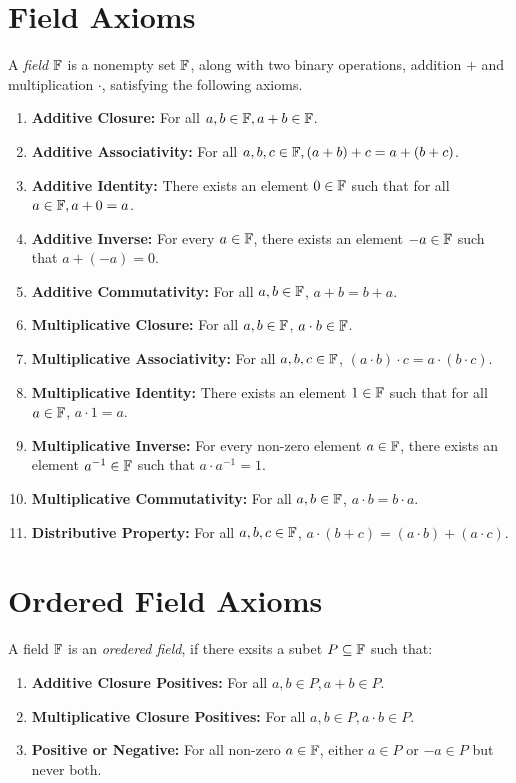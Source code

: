 \section{Field Axioms}

\begin{definition}
  A \emph{field} $\mathbb{F}$ is a nonempty set $\mathbb{F}$, along with two binary operations, addition $+$ and multiplication $\cdot$, satisfying the following axioms.
  \begin{enumerate}
    \item \textbf{Additive Closure:} For all $a, b \in \mathbb{F}, a + b \in \mathbb{F}$.
    \item \textbf{Additive Associativity:} For all $a, b, c \in \mathbb{F}, (a + b) + c = a + (b + c)$.
    \item \textbf{Additive Identity:} There exists an element $0 \in \mathbb{F}$ such that for all $a \in \mathbb{F}, a + 0 = a$.
    \item \textbf{Additive Inverse:} For every $a \in \mathbb{F}$, there exists an element $-a \in \mathbb{F}$ such that $a + (-a) = 0$.
    \item \textbf{Additive Commutativity:} For all $a, b \in \mathbb{F}$, $a + b = b + a$.
    \item \textbf{Multiplicative Closure:} For all $a, b \in \mathbb{F}$, $a \cdot b \in \mathbb{F}$.
    \item \textbf{Multiplicative Associativity:} For all $a, b, c \in \mathbb{F}$, $(a \cdot b) \cdot c = a \cdot (b \cdot c)$.
    \item \textbf{Multiplicative Identity:} There exists an element $1 \in \mathbb{F}$ such that for all $a \in \mathbb{F}$, $a \cdot 1 = a$.
    \item \textbf{Multiplicative Inverse:} For every non-zero element $a \in \mathbb{F}$, there exists an element $a^{-1} \in \mathbb{F}$ such that $a \cdot a^{-1} = 1$.
    \item \textbf{Multiplicative Commutativity:} For all $a, b \in \mathbb{F}$, $a \cdot b = b \cdot a$.
    \item \textbf{Distributive Property:} For all $a, b, c \in \mathbb{F}$, $a \cdot (b + c) = (a \cdot b) + (a \cdot c)$.
  \end{enumerate}
\end{definition}

\section{Ordered Field Axioms}

\begin{definition}
  A field $\mathbb{F}$ is an \emph{oredered field}, if there exsits a subet $P \subseteq \mathbb{F}$ such that:
  \begin{enumerate}
    \item \textbf{Additive Closure Positives:} For all $a, b \in P, a + b \in P$.
    \item \textbf{Multiplicative Closure Positives:} For all $a, b \in P, a \cdot b \in P$.
    \item \textbf{Positive or Negative:} For all non-zero $a \in \mathbb{F}$, either $a \in P$ or $-a \in P$ but never both.
  \end{enumerate}
\end{definition}


